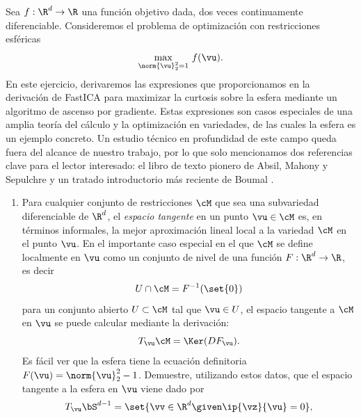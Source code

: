 \documentclass[../../book-main.tex]{subfiles}
\begin{document}
\begin{exercise}\label{exercise:sphere-calculus}
    Sea $f : \R^d \to \R$ una función objetivo dada,
    dos veces continuamente diferenciable. Consideremos
    el problema de optimización con restricciones esféricas
    \begin{equation}\label{eq:exercise-sphere-constrained-max}
        \max_{\norm{\vu}_2^2 = 1}\, f(\vu).
    \end{equation}
    En este ejercicio, derivaremos las expresiones que proporcionamos en la
    derivación de FastICA para maximizar la curtosis sobre la esfera mediante un
    algoritmo de ascenso por gradiente.
    Estas expresiones son casos especiales de una amplia teoría del cálculo
    y la optimización en variedades, de las cuales la esfera es un
    ejemplo concreto. Un estudio técnico en profundidad de este campo
    queda fuera del alcance de nuestro trabajo, por lo que solo mencionamos dos referencias clave
    para el lector interesado: el libro de texto pionero de
    Absil, Mahony y Sepulchre \cite{Absil2009-nc} y un tratado introductorio más reciente de
    Boumal \cite{Boumal2023-rj}.
    \begin{enumerate}
        \item Para cualquier conjunto de restricciones $\cM$ que sea una subvariedad diferenciable
            de $\R^d$, el \textit{espacio tangente} en un punto $\vu \in \cM$ es,
            en términos informales, la mejor aproximación lineal local a la
            variedad $\cM$ en el punto $\vu$.
            En el importante caso especial en el que $\cM$ se define
            localmente en $\vu$ como un conjunto de nivel de una función $F : \R^d \to \R$,
            es decir
            \begin{equation*}
                U \cap \cM = F^{-1}(\set{0})
            \end{equation*}
            para un conjunto abierto $U \subset \cM$ tal que $\vu \in U$,
            el espacio tangente a $\cM$ en $\vu$ se puede calcular
            mediante la derivación:
            \begin{equation*}
                T_{\vu} \cM = \Ker(DF_{\vu}).
            \end{equation*}
            Es fácil ver que la esfera tiene la ecuación definitoria
            $F(\vu) = \norm{\vu}_2^2 - 1$.
            Demuestre, utilizando estos datos, que el espacio tangente a la
            esfera en $\vu$ viene dado por
            \begin{equation*}
                T_{\vu} \bS^{d-1} = \set{\vv \in \R^d \given \ip{\vz}{\vu} = 0},

\end{equation*}
\end{enumerate}
\end{exercise}
\end{document}
